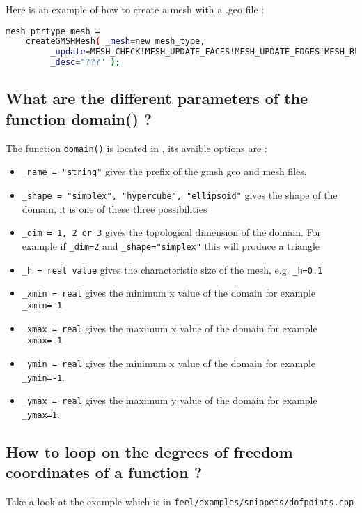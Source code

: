 Here is an example of how to create a mesh with a .geo file :
\begin{lstlisting}[language=sh]
 mesh_ptrtype mesh = 
	createGMSHMesh( _mesh=new mesh_type,
         _update=MESH_CHECK!MESH_UPDATE_FACES!MESH_UPDATE_EDGES!MESH_RENUMBER,
         _desc="???" );
\end{lstlisting}


\subsection{What are the different parameters of the function domain() ?}
The function \lstinline!domain()! is located in \lstinline!!, its avaible options are :
\begin{itemize}
\item \lstinline!_name = "string"! gives the prefix of the gmsh geo and mesh files,
\item \lstinline!_shape = "simplex", "hypercube", "ellipsoid"! gives the shape of the domain, it is one of these three possibilities
\item \lstinline!_dim = 1, 2 or 3! gives the topological dimension of the domain. For example if \lstinline!_dim=2! and \lstinline!_shape="simplex"! this will produce a triangle
\item \lstinline!_h = real value! gives the characteristic size of the mesh, e.g. \lstinline!_h=0.1!
\item \lstinline!_xmin = real! gives the minimum x value of the domain for example \lstinline!_xmin=-1!
\item \lstinline!_xmax = real! gives the maximum x value of the domain for example \lstinline!_xmax=-1!
\item \lstinline!_ymin = real! gives the minimum x value of the domain for example \lstinline!_ymin=-1!.
\item \lstinline!_ymax = real!  gives the maximum y value of the domain for example \lstinline!_ymax=1!.

\end{itemize}


\subsection{How to loop on the degrees of freedom coordinates of a function ?}

Take a look at the example which is in \lstinline!feel/examples/snippets/dofpoints.cpp! 

%


